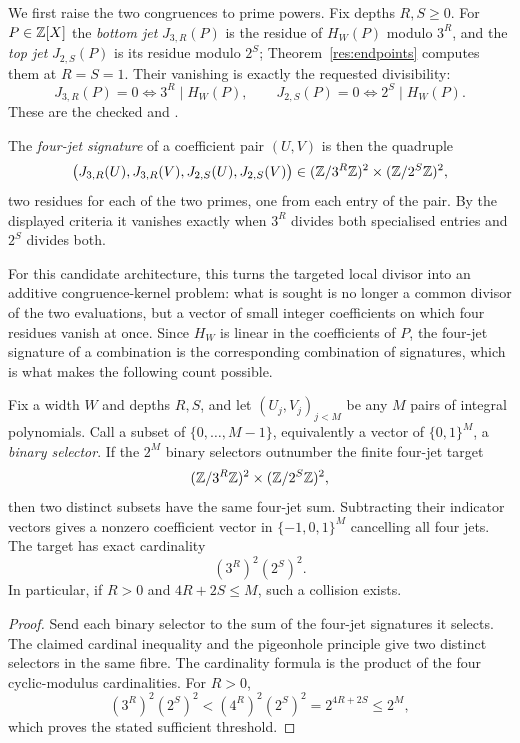 \documentclass[11pt]{article}
\begin{document}
We first raise the two congruences to prime powers.  Fix depths \(R,S\ge0\).
For \(P\in\mathbb{Z}[X]\) the \emph{bottom jet} \(J_{3,R}(P)\) is the residue of
\(H_W(P)\) modulo \(3^R\), and the \emph{top jet} \(J_{2,S}(P)\) is its residue
modulo \(2^S\); Theorem~\ref{res:endpoints} computes them at \(R=S=1\).  Their
vanishing is exactly the requested divisibility:
\[
 J_{3,R}(P)=0\iff 3^R\mid H_W(P),\qquad
 J_{2,S}(P)=0\iff 2^S\mid H_W(P).
\]
These are the checked
 and
.

The \emph{four-jet signature} of a coefficient pair
\((U,V)\) is then the quadruple
\[
 \bigl(J_{3,R}(U),J_{3,R}(V),J_{2,S}(U),J_{2,S}(V)\bigr)
 \in(\mathbb{Z}/3^R\mathbb{Z})^2\times(\mathbb{Z}/2^S\mathbb{Z})^2 ,
\]
two residues for each of the two primes, one from each entry of the pair.  By
the displayed criteria it vanishes exactly when \(3^R\) divides both specialised
entries and \(2^S\) divides both.

For this candidate architecture, this turns the targeted local divisor into an additive
congruence-kernel problem: what is sought is no longer a common divisor of
the two evaluations, but a vector of small integer coefficients on which four
residues vanish at once.  Since \(H_W\) is linear in the coefficients of \(P\),
the four-jet signature of a combination is the corresponding combination of
signatures, which is what makes the following count possible.

\begin{theorem}\label{res:jetkernel}
Fix a width \(W\) and depths \(R,S\), and let \((U_j,V_j)_{j<M}\) be any \(M\)
pairs of integral polynomials.  Call a subset of \(\{0,\dots,M-1\}\), equivalently
a vector of \(\{0,1\}^M\), a \emph{binary selector}.  If the
\(2^M\) binary selectors outnumber the finite four-jet target
\[
 (\mathbb{Z}/3^R\mathbb{Z})^2\times(\mathbb{Z}/2^S\mathbb{Z})^2,
\]
then two distinct subsets have the same four-jet sum.  Subtracting their
indicator vectors gives a nonzero coefficient vector in
\(\{-1,0,1\}^M\) cancelling all four jets.  The target has exact cardinality
\[
 (3^R)^2(2^S)^2.
\]
In particular, if \(R>0\) and \(4R+2S\le M\), such a collision exists.
\end{theorem}

\begin{proof}
Send each binary selector to the sum of the four-jet signatures it selects.
The claimed cardinal inequality and the pigeonhole principle give two
distinct selectors in the same fibre.  The cardinality formula is the product
of the four cyclic-modulus cardinalities.  For \(R>0\),
\[
 (3^R)^2(2^S)^2<(4^R)^2(2^S)^2=2^{4R+2S}\le2^M,
\]
which proves the stated sufficient threshold.
\end{proof}
\end{document}
